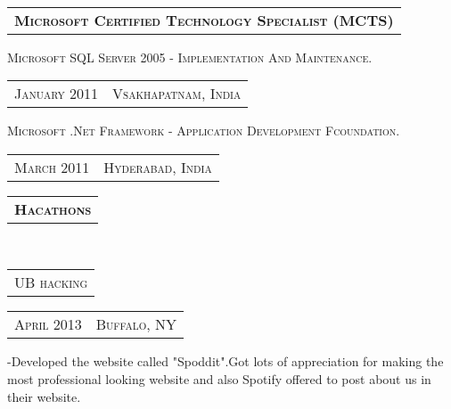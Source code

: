 \documentclass[10pt,letterpaper,oneside]{article}
\begin{document}
    \vspace{4pt}\\
    \begin{tabular}{l}
        \textbf{\normalsize M\textsc{icrosoft} C\textsc{ertified} T\textsc{echnology} \textbf{S\textsc{pecialist} (MCTS)}}
    \end{tabular}
    \vspace{2pt}
    \begin{adjustwidth}{7pt}{0pt}
        {\small M\textsc{icrosoft} SQL S\textsc{erver} 2005 - I\textsc{mplementation} A\textsc{nd} M\textsc{aintenance}.}
        \hspace{1.55in}
        \textcolor{light-gray}{
        \begin{tabular}{c|c}
            {\small J\textsc{anuary 2011}}
            &{\small V\textsc{sakhapatnam}, I\textsc{ndia}}
        \end{tabular}
    }
    \end{adjustwidth}
    \vspace{-12pt}
    \begin{adjustwidth}{7pt}{0pt}
        {\small M\textsc{icrosoft} .N\textsc{et} F\textsc{ramework} - A\textsc{pplication} D\textsc{evelopment} F\textsc{coundation}.}
        \hspace{1.52in}
    \textcolor{light-gray}{
        \begin{tabular}{c|c}
            {\small M\textsc{arch 2011}}
            &{\small H\textsc{yderabad}, I\textsc{ndia}}
        \end{tabular}
    }
    \vspace{-10pt}
    \end{adjustwidth}
    \begin{tabular}{c}
        \textbf{\normalsize H\textsc{acathons}}
    \end{tabular}\\
    \begin{tabular}{c}
        {\small UB\textsc{ hacking}}
    \end{tabular}
    \hspace{5.3in}
    \textcolor{light-gray}{
        \begin{tabular}{c|c}
            {\small A\textsc{pril 2013}}
            &{\small B\textsc{uffalo}, NY}
        \end{tabular}
    }
    \vspace{-12pt}
    \begin{adjustwidth}{7pt}{0pt}
        {\footnotesize  -Developed the website called "Spoddit".Got lots of appreciation for 
        making the most professional looking website and also Spotify offered to post
        about us in their website.}
    \end{adjustwidth}
\end{document}
